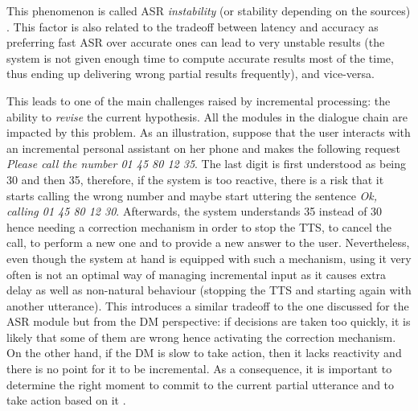                                                   This phenomenon is called ASR \textit{instability} (or stability depending on the sources) \cite{Selfridge2011}. This factor is also related to the tradeoff between latency and accuracy as preferring fast ASR over accurate ones can lead to very unstable results (the system is not given enough time to compute accurate results most of the time, thus ending up delivering wrong partial results frequently), and vice-versa.
                                                  
This leads to one of the main challenges raised by incremental processing: the ability to \textit{revise} the current hypothesis. All the modules in the dialogue chain are impacted by this problem. As an illustration, suppose that the user interacts with an incremental personal assistant on her phone and makes the following request \textit{Please call the number 01 45 80 12 35}. The last digit is first understood as being 30 and then 35, therefore, if the system is too reactive, there is a risk that it starts calling the wrong number and maybe start uttering the sentence \textit{Ok, calling 01 45 80 12 30}. Afterwards, the system understands 35 instead of 30 hence needing a correction mechanism in order to stop the TTS, to cancel the call, to perform a new one and to provide a new answer to the user. Nevertheless, even though the system at hand is equipped with such a mechanism, using it very often is not an optimal way of managing incremental input as it causes extra delay as well as non-natural behaviour (stopping the TTS and starting again with another utterance). This introduces a similar tradeoff to the one discussed for the ASR module but from the DM perspective: if decisions are taken too quickly, it is likely that some of them are wrong hence activating the correction mechanism. On the other hand, if the DM is slow to take action, then it lacks reactivity and there is no point for it to be incremental. As a consequence, it is important to determine the right moment to commit to the current partial utterance and to take action based on it \cite{Raux2008,Lu2011}.

